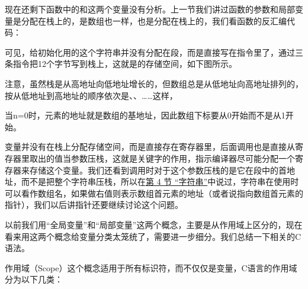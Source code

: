现在还剩下函数中的和这两个变量没有分析。上一节我们讲过函数的参数和局部变量是分配在栈上的，是数组也一样，也是分配在栈上的，我们看函数的反汇编代码：




可见，给初始化用的这个字符串并没有分配在段，而是直接写在指令里了，通过三条指令把12个字节写到栈上，这就是的存储空间，如下图所示。




注意，虽然栈是从高地址向低地址增长的，但数组总是从低地址向高地址排列的，按从低地址到高地址的顺序依次是、、……这样，


\begin{BookLiteral}
\end{BookLiteral}


当n=\BookSplit{}0时，元素的地址就是数组的基地址，因此数组下标要从0开始而不是从1开始。



变量并没有在栈上分配存储空间，而是直接存在寄存器里，后面调用也是直接从寄存器里取出的值当参数压栈，这就是关键字的作用，指示编译器尽可能分配一个寄存器来存储这个变量。我们还看到调用时对于这个参数压栈的是它在段中的首地址，而不是把整个字符串压栈，所以在\hyperlink{db.ch08s04.id2734544}{第 4 节 “字符串”}中说过，字符串在使用时可以看作数组名，如果做右值则表示数组首元素的地址（或者说指向数组首元素的指针），我们以后讲指针还要继续讨论这个问题。



以前我们用“全局变量”和“局部变量”这两个概念，主要是从作用域上区分的，现在看来用这两个概念给变量分类太笼统了，需要进一步细分。我们总结一下相关的C语法。



作用域（Scope）这个概念适用于所有标识符，而不仅仅是变量，C语言的作用域分为以下几类：


